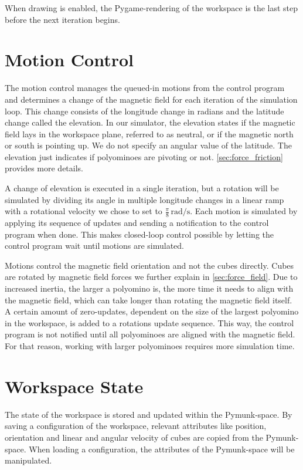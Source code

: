 When drawing is enabled, the Pygame-rendering of the workspace is the last step before the next iteration begins.


\section{Motion Control}
\label{sec:motion_control}

The motion control manages the queued-in motions from the control program and determines a change of the magnetic field for each iteration of the simulation loop.
This change consists of the longitude change in radians and the latitude change called the elevation.
In our simulator, the elevation states if the magnetic field lays in the workspace plane, referred to as neutral, or if the magnetic north or south is pointing up.
We do not specify an angular value of the latitude.
The elevation just indicates if polyominoes are pivoting or not.
\autoref{sec:force_friction} provides more details.

A change of elevation is executed in a single iteration, but a rotation will be simulated by dividing its angle in multiple longitude changes in a linear ramp with a rotational velocity we chose to set to $\frac{\pi}{8} \, \text{rad}/\text{s}$.
Each motion is simulated by applying its sequence of updates and sending a notification to the control program when done.
This makes closed-loop control possible by letting the control program wait until motions are simulated.

Motions control the magnetic field orientation and not the cubes directly.
Cubes are rotated by magnetic field forces we further explain in \autoref{sec:force_field}.
Due to increased inertia, the larger a polyomino is, the more time it needs to align with the magnetic field, which can take longer than rotating the magnetic field itself.
A certain amount of zero-updates, dependent on the size of the largest polyomino in the workspace, is added to a rotations update sequence.
This way, the control program is not notified until all polyominoes are aligned with the magnetic field.
For that reason, working with larger polyominoes requires more simulation time.



\section{Workspace State}
\label{sec:workspace_state}

The state of the workspace is stored and updated within the Pymunk-space.
By saving a configuration of the workspace, relevant attributes like position, orientation and linear and angular velocity of cubes are copied from the Pymunk-space.
When loading a configuration, the attributes of the Pymunk-space will be manipulated.

